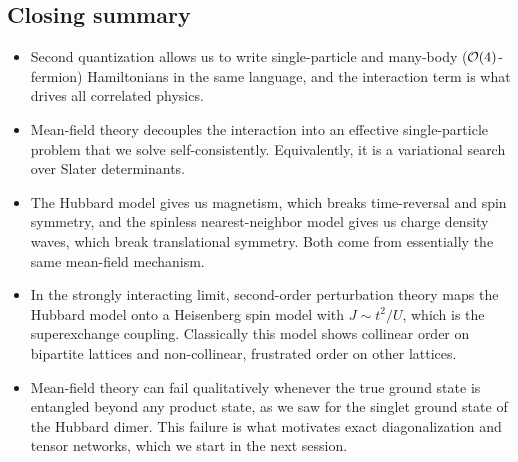 \documentclass[lecture_notes.tex]{subfiles}
\begin{document}
\subsection*{Closing summary}
\begin{itemize}[nosep]
  \item Second quantization allows us to write single-particle and many-body ($\mathcal{O}\!\left(4\right)$-fermion)
    Hamiltonians in the same language, and the interaction term is what drives all correlated
    physics.
  \item Mean-field theory decouples the interaction into an effective single-particle problem
    that we solve self-consistently. Equivalently, it is a variational search over Slater
    determinants.
  \item The Hubbard model gives us magnetism, which breaks time-reversal and spin symmetry, and
    the spinless nearest-neighbor model gives us charge density waves, which break translational
    symmetry. Both come from essentially the same mean-field mechanism.
  \item In the strongly interacting limit, second-order perturbation theory maps the Hubbard
    model onto a Heisenberg spin model with $J\sim t^2/U$, which is the superexchange coupling.
    Classically this model shows collinear order on bipartite lattices and non-collinear,
    frustrated order on other lattices.
  \item Mean-field theory can fail qualitatively whenever the true ground state is entangled
    beyond any product state, as we saw for the singlet ground state of the Hubbard dimer. This
    failure is what motivates exact diagonalization and tensor networks, which we start in the
    next session.
\end{itemize}
\end{document}
